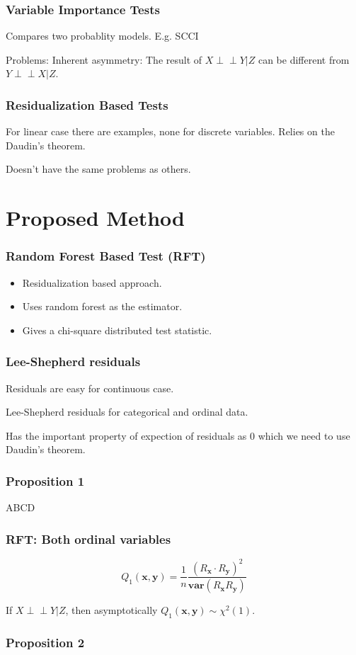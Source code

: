 \documentclass{beamer}
\def\ci{\perp\!\!\!\!\!\perp}
\begin{document}
\begin{frame}
	\frametitle{Variable Importance Tests}
	Compares two probablity models. E.g. SCCI

	Problems: Inherent asymmetry: The result of $ X \ci Y | Z $ can be 
	different from $ Y \ci X | Z $.
\end{frame}

\begin{frame}
	\frametitle{Residualization Based Tests}
	For linear case there are examples, none for discrete variables.
	Relies on the Daudin's theorem.

	Doesn't have the same problems as others.
\end{frame}

\section{Proposed Method}
\begin{frame}
	\frametitle{Random Forest Based Test (RFT)}
	\begin{itemize}
		\item Residualization based approach.
		\item Uses random forest as the estimator.
		\item Gives a chi-square distributed test statistic.
	\end{itemize}
\end{frame}

\begin{frame}
	\frametitle{Lee-Shepherd residuals}
	Residuals are easy for continuous case.

	Lee-Shepherd residuals for categorical and ordinal data.

	Has the important property of expection of residuals as $ 0 $ which 
	we need to use Daudin's theorem.
\end{frame}

\begin{frame}
	\frametitle{Proposition 1}
	ABCD
\end{frame}

\begin{frame}
	\frametitle{RFT: Both ordinal variables}
	$$ Q_1(\bm{x}, \bm{y}) = \frac{1}{n} \frac{(R_{\bm{x}} \cdot R_{\bm{y}})^2}{\bm{var}(R_{\bm{x}} R_{\bm{y}})} $$

	If $ X \ci Y | Z $, then asymptotically $ Q_1(\bm{x}, \bm{y}) \sim \chi^2(1) $.
\end{frame}

\begin{frame}
	\frametitle{Proposition 2}
\end{frame}
\end{document}
